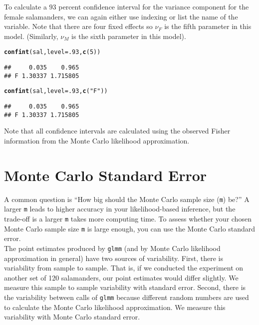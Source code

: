 \documentclass[11pt]{article}\usepackage[]{graphicx}\usepackage[]{color}
\makeatletter
\newcommand{\hlnum}[1]{\textcolor[rgb]{0.686,0.059,0.569}{#1}}%
\newcommand{\hlstr}[1]{\textcolor[rgb]{0.192,0.494,0.8}{#1}}%
\newcommand{\hlstd}[1]{\textcolor[rgb]{0.345,0.345,0.345}{#1}}%
\newcommand{\hlkwc}[1]{\textcolor[rgb]{0.333,0.667,0.333}{#1}}%
\newcommand{\hlkwd}[1]{\textcolor[rgb]{0.737,0.353,0.396}{\textbf{#1}}}%
\newenvironment{kframe}{%
 \def\at@end@of@kframe{}%
 \ifinner\ifhmode%
  \def\at@end@of@kframe{\end{minipage}}%
  \begin{minipage}{\columnwidth}%
 \fi\fi%
 \def\FrameCommand##1{\hskip\@totalleftmargin \hskip-\fboxsep
 \colorbox{shadecolor}{##1}\hskip-\fboxsep
     \hskip-\linewidth \hskip-\@totalleftmargin \hskip\columnwidth}%
 \MakeFramed {\advance\hsize-\width
   \@totalleftmargin\z@ \linewidth\hsize
   \@setminipage}}%
 {\par\unskip\endMakeFramed%
 \at@end@of@kframe}
\newenvironment{knitrout}{}{} %
\makeatother
\begin{document}
To calculate a $93$ percent confidence interval for the variance component for the female salamanders, we can again either use indexing or list the name of the variable. Note that there are four fixed effects so $\nu_F$ is the fifth parameter in this model. (Similarly, $\nu_M$ is the sixth parameter in this model).
\begin{knitrout}
\color{fgcolor}\begin{kframe}
\begin{alltt}
\hlkwd{confint}\hlstd{(sal,}\hlkwc{level}\hlstd{=}\hlnum{.93}\hlstd{,}\hlkwd{c}\hlstd{(}\hlnum{5}\hlstd{))}
\end{alltt}
\begin{verbatim}
##     0.035    0.965
## F 1.30337 1.715805
\end{verbatim}
\begin{alltt}
\hlkwd{confint}\hlstd{(sal,}\hlkwc{level}\hlstd{=}\hlnum{.93}\hlstd{,}\hlkwd{c}\hlstd{(}\hlstr{"F"}\hlstd{))}
\end{alltt}
\begin{verbatim}
##     0.035    0.965
## F 1.30337 1.715805
\end{verbatim}
\end{kframe}
\end{knitrout}

Note that all confidence intervals are calculated using the observed Fisher information from the Monte Carlo likelihood approximation.\\

\section{Monte Carlo Standard Error}
A common question is ``How big should the Monte Carlo sample size (\texttt{m}) be?'' A larger \texttt{m} leads to higher accuracy in your likelihood-based inference, but the trade-off is a larger \texttt{m} takes more computing time. To assess whether your chosen Monte Carlo sample size \texttt{m} is large enough, you can use the Monte Carlo standard error. \\

The point estimates produced by \texttt{glmm} (and by Monte Carlo likelihood approximation in general) have two sources of variability. First,  there is variability from sample to sample.  That is, if we conducted the experiment on another set of 120 salamanders, our point estimates would differ slightly. We measure this sample to sample variability with standard error. Second, there is the variability between calls of \texttt{glmm} because different random numbers are used to calculate the Monte Carlo likelihood approximation. We measure this variability with Monte Carlo standard error.\\
\end{document}
